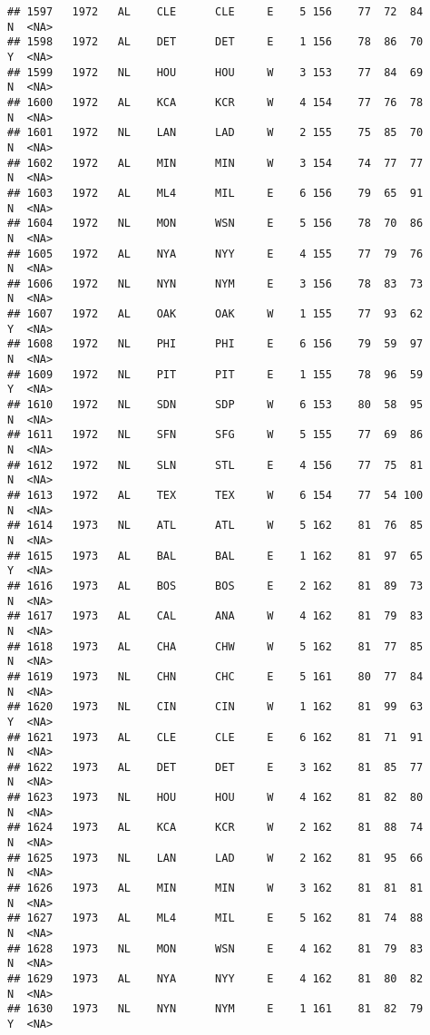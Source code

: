 \documentclass[]{article}
\begin{document}
\begin{verbatim}
## 1597   1972   AL    CLE      CLE     E    5 156    77  72  84      N  <NA>
## 1598   1972   AL    DET      DET     E    1 156    78  86  70      Y  <NA>
## 1599   1972   NL    HOU      HOU     W    3 153    77  84  69      N  <NA>
## 1600   1972   AL    KCA      KCR     W    4 154    77  76  78      N  <NA>
## 1601   1972   NL    LAN      LAD     W    2 155    75  85  70      N  <NA>
## 1602   1972   AL    MIN      MIN     W    3 154    74  77  77      N  <NA>
## 1603   1972   AL    ML4      MIL     E    6 156    79  65  91      N  <NA>
## 1604   1972   NL    MON      WSN     E    5 156    78  70  86      N  <NA>
## 1605   1972   AL    NYA      NYY     E    4 155    77  79  76      N  <NA>
## 1606   1972   NL    NYN      NYM     E    3 156    78  83  73      N  <NA>
## 1607   1972   AL    OAK      OAK     W    1 155    77  93  62      Y  <NA>
## 1608   1972   NL    PHI      PHI     E    6 156    79  59  97      N  <NA>
## 1609   1972   NL    PIT      PIT     E    1 155    78  96  59      Y  <NA>
## 1610   1972   NL    SDN      SDP     W    6 153    80  58  95      N  <NA>
## 1611   1972   NL    SFN      SFG     W    5 155    77  69  86      N  <NA>
## 1612   1972   NL    SLN      STL     E    4 156    77  75  81      N  <NA>
## 1613   1972   AL    TEX      TEX     W    6 154    77  54 100      N  <NA>
## 1614   1973   NL    ATL      ATL     W    5 162    81  76  85      N  <NA>
## 1615   1973   AL    BAL      BAL     E    1 162    81  97  65      Y  <NA>
## 1616   1973   AL    BOS      BOS     E    2 162    81  89  73      N  <NA>
## 1617   1973   AL    CAL      ANA     W    4 162    81  79  83      N  <NA>
## 1618   1973   AL    CHA      CHW     W    5 162    81  77  85      N  <NA>
## 1619   1973   NL    CHN      CHC     E    5 161    80  77  84      N  <NA>
## 1620   1973   NL    CIN      CIN     W    1 162    81  99  63      Y  <NA>
## 1621   1973   AL    CLE      CLE     E    6 162    81  71  91      N  <NA>
## 1622   1973   AL    DET      DET     E    3 162    81  85  77      N  <NA>
## 1623   1973   NL    HOU      HOU     W    4 162    81  82  80      N  <NA>
## 1624   1973   AL    KCA      KCR     W    2 162    81  88  74      N  <NA>
## 1625   1973   NL    LAN      LAD     W    2 162    81  95  66      N  <NA>
## 1626   1973   AL    MIN      MIN     W    3 162    81  81  81      N  <NA>
## 1627   1973   AL    ML4      MIL     E    5 162    81  74  88      N  <NA>
## 1628   1973   NL    MON      WSN     E    4 162    81  79  83      N  <NA>
## 1629   1973   AL    NYA      NYY     E    4 162    81  80  82      N  <NA>
## 1630   1973   NL    NYN      NYM     E    1 161    81  82  79      Y  <NA>

\end{verbatim}
\end{document}
